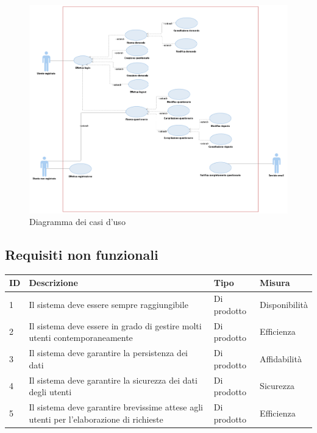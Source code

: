 \documentclass[12pt]{article}
\begin{document}
\begin{figure}[H]
\includegraphics[scale=0.45, left]{fig_usecase_diagram.png}
\caption{Diagramma dei casi d'uso}
\end{figure}

\subsection{Requisiti non funzionali}

\begin{table}[H]
\begin{adjustbox}{max width=1.1\textwidth,center}
\begin{tabular}{|l|l|l|l|}
\hline
\rowcolor[HTML]{3531FF} 
{\color[HTML]{FFFFFF} ID} & {\color[HTML]{FFFFFF} Descrizione}                                                      & {\color[HTML]{FFFFFF} Tipo} & {\color[HTML]{FFFFFF} Misura} \\ \hline
1                         & Il sistema deve essere sempre raggiungibile                                             & Di prodotto                 & Disponibilità                 \\ \hline
2                         & Il sistema deve essere in grado di gestire molti utenti contemporaneamente              & Di prodotto                 & Efficienza                    \\ \hline
3                         & Il sistema deve garantire la persistenza dei dati                                       & Di prodotto                 & Affidabilità                  \\ \hline
4                         & Il sistema deve garantire la sicurezza dei dati degli utenti                            & Di prodotto                 & Sicurezza                     \\ \hline
5                         & Il sistema deve garantire brevissime attese agli utenti per l'elaborazione di richieste & Di prodotto                 & Efficienza                    \\ \hline
\end{tabular}
\end{adjustbox}
\end{table}
\end{document}
